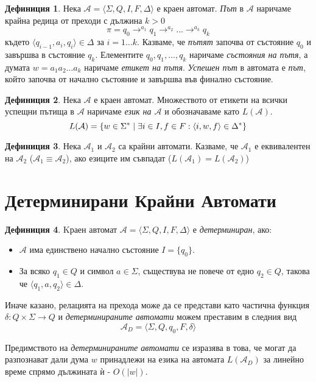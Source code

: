 \documentclass[11pt, oneside]{article}
\theoremstyle{definition}
\newtheorem{definition}{Дефиниция}[section]
\begin{document}
\begin{definition} 
	Нека \( \mathcal{A} = \langle \Sigma, Q, I, F, \Delta \rangle \) е краен автомат. \emph{Път} в \( \mathcal{A} \) наричаме крайна редица от преходи с дължина \( k > 0 \) 
	\[ \pi = q_0 \to^{a_1} q_1 \to^{a_2} \ldots \to^{a_k} q_k \] 
	където \( \langle q_{i-1}, a_i, q_i \rangle \in \Delta \) за \( i = 1 \ldots k \). Казваме, че \emph{пътят} започва от състояние \( q_0 \) и завършва в състояние \( q_k \). Елементите \( q_0,q_1, \ldots ,q_k \) наричаме \emph{състояния на пътя}, а думата \( w = a_1 a_2 \ldots a_k \) наричаме \emph{етикет на пътя}. \newline \emph{Успешен път} в автомата е \emph{път}, който започва от начално състояние и завършва във финално състояние.
\end{definition}

\begin{definition} 
	Нека \( \mathcal{A} \) е краен автомат. Множеството от етикети на всички успещни пътища в \( \mathcal{A} \) наричаме \emph{език на \( \mathcal{A} \)} и обозначаваме като \( L(\mathcal{A}) \). \[ L(\mathcal{A}) = \{ w \in \Sigma^* \hspace{0.1cm} | \hspace{0.1cm} \exists i \in I, f \in F : \langle i, w, f \rangle \in \Delta^* \} \]
\end{definition}

\begin{definition} 
	Нека \( \mathcal{A}_1 \) и \( \mathcal{A}_2 \) са крайни автомати. Казваме, че \( \mathcal{A}_1 \) е еквивалентен на \( \mathcal{A}_2 \) (\( \mathcal{A}_1 \equiv \mathcal{A}_2 \)), ако езиците им съвпадат (\( L(\mathcal{A}_1) = L(\mathcal{A}_2) \))
\end{definition}

\section{Детерминирани Крайни Автомати}

\begin{definition}
	Kраен автомат \( \mathcal{A} = \langle \Sigma, Q, I, F, \Delta \rangle \) е \emph{детерминиран}, ако:

	\begin{itemize}
		\item \( \mathcal{A} \) има единствено начално състояние \(I = \{q_0\}\).
		\item За всяко \( q_1 \in Q \) и символ \( a \in \Sigma \), съществува не повече от едно \( q_2 \in Q \), такова че \( \langle q_1, a, q_2 \rangle \in \Delta \).
	\end{itemize} 

	\noindent Иначе казано, релацията на прехода може да се представи като частична функция \( \delta: Q \times \Sigma \to Q \) и \emph{детерминираните автомати} можем преставим в следния вид \[ \mathcal{A}_D = \langle \Sigma, Q, q_0, F, \delta \rangle \]

	Предимството на \emph{детерминираните автомати} се изразява в това, че могат да разпознават дали дума \( w \) принадлежи на езика на автомата \( L(\mathcal{A}_D) \) за линейно време спрямо дължината ѝ - \( O(|w|) \).
\end{definition}
\end{document}

